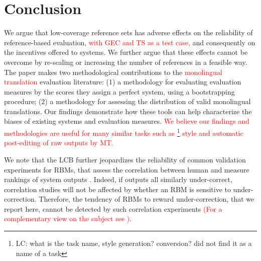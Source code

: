 \documentclass[11pt, a4paper]{article}
\newcommand{\lc}[1]{\footnote{\color{blue}LC: #1}}
\begin{document}
\section{Conclusion}\label{sec:conclusion}



We argue that low-coverage reference sets has adverse effects on the reliability
of reference-based evaluation, \textcolor{red}{with GEC and TS as a test case,} and consequently on the incentives offered to systems.
We further argue that these effects cannot be overcome by re-scaling or increasing the number of references in a feasible way. 
The paper makes two methodological contributions to the \textcolor{red}{monolingual translation} evaluation literature:
(1) a methodology for evaluating evaluation measures by the scores they assign a perfect system, using a bootstrapping procedure;
(2) a methodology for assessing the distribution of valid monolingual translations.
Our findings demonstrate how these tools can help characterize the biases of existing systems and evaluation measures.
\textcolor{red}{We believe our findings and methodologies are useful for many similar tasks such as \lc{what is the task name, style generation? conversion? did not find it as a name of a task} style and automatic post-editing of raw outputs by MT.}

We note that the LCB further jeopardizes the reliability of common validation experiments for RBMs,
that assess the correlation between human and measure rankings of system outputs \cite{grundkiewicz2015human}.
Indeed, if outputs all similarly under-correct, correlation studies will not be affected by whether an RBM is sensitive to under-correction.
Therefore, the tendency of RBMs to reward under-correction, that we report here, 
cannot be detected by such correlation experiments \textcolor{red}{(For a complementary view on the subject see \cite{choshen2018maege})}.
\end{document}
